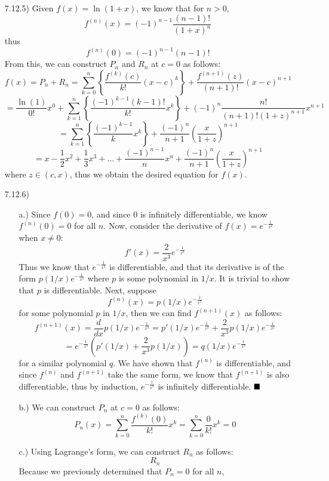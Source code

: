 \documentclass[11pt]{article}
\newcommand{\braces}[1]{\left\{#1\right\}}           %
\newcommand{\parens}[1]{\left(#1\right)}             %
\newcommand{\derv}[2]{\dfrac{d#1}{d#2}}
\begin{document}
\pagestyle{fancy}
\fancyhead{}

\normalsize

\begin{itemize}
    \item [7.12.5)] Given $f(x)=\ln(1+x)$, we know that for $n>0$,
    \[f^{(n)}(x)=(-1)^{n-1}\frac{(n-1)!}{(1+x)^n}\]
    thus
    \[f^{(n)}(0)=(-1)^{n-1}(n-1)!\]
    From this, we can construct $P_n$ and $R_n$ at $c=0$ as follows:
    \[f(x)=P_n+R_n=\sum_{k=0}^n\braces{\frac{f^{(k)}(c)}{k!}(x-c)^k}+\frac{f^{(n+1)}(z)}{(n+1)!}(x-c)^{n+1}\]
    \[=\frac{\ln(1)}{0!}x^0+\sum_{k=1}^n\braces{\frac{(-1)^{k-1}(k-1)!}{k!}x^k}+(-1)^{n}\frac{n!}{(n+1)!(1+z)^{n+1}}x^{n+1}\]
    \[=\sum_{k=1}^n\braces{\frac{(-1)^{k-1}}{k}x^k}+\frac{(-1)^n}{n+1}\parens{\frac{x}{1+z}}^{n+1}\]
    \[=x-\frac{1}{2}x^2+\frac{1}{3}x^3+\dots+\frac{(-1)^{n-1}}{n}x^n+\frac{(-1)^n}{n+1}\parens{\frac{x}{1+z}}^{n+1}\]
    where $z\in(c,x)$, thus we obtain the desired equation for $f(x)$.

    \item [7.12.6)] \begin{itemize}
        \item [a.)] Since $f(0)=0$, and since $0$ is infinitely differentiable, we know $f^{(n)}(0)=0$ for all $n$. Now, consider the derivative of $f(x)=e^{-\frac{1}{x^2}}$ when $x\ne0$:
        \[f'(x)=\frac{2}{x^3}e^{-\frac{1}{x^2}}\]
        Thus we know that $e^{-\frac{1}{x^2}}$ is differentiable, and that its derivative is of the form $p(1/x)e^{-\frac{1}{x^2}}$ where $p$ is some polynomial in $1/x$. It is trivial to show that $p$ is differentiable. Next, suppose
        \[f^{(n)}(x)=p(1/x)e^{-\frac{1}{x^2}}\]
        for some polynomial $p$ in $1/x$, then we can find $f^{(n+1)}(x)$ as follows:
        \[f^{(n+1)}(x)=\derv{}{x}p(1/x)e^{-\frac{1}{x^2}}=p'(1/x)e^{-\frac{1}{x^2}}+\frac{2}{x^3}p(1/x)e^{-\frac{1}{x^2}}\]
        \[=e^{-\frac{1}{x^2}}\parens{p'(1/x)+\frac{2}{x^3}p(1/x)}=q(1/x)e^{-\frac{1}{x^2}}\]
        for a similar polynomial $q$. We have shown that $f^{(n)}$ is differentiable, and since $f^{(n)}$ and $f^{(n+1)}$ take the same form, we know that $f^{(n+1)}$ is also differentiable, thus by induction, $e^{-\frac{1}{x^2}}$ is infinitely differentiable.
        $\newline\strut\hfill\blacksquare$

        \item [b.)] We can construct $P_n$ at $c=0$ as follows:
        \[P_n(x)=\sum_{k=0}^n\frac{f^{(k)}(0)}{k!}x^k=\sum_{k=0}^n\frac{0}{k!}x^k=0\]

        \item [c.)] Using Lagrange's form, we can construct $R_n$ as follows:
        \[R_n\]
        Because we previously determined that $P_n=0$ for all $n$,
    \end{itemize}
\end{itemize}
\end{document}
